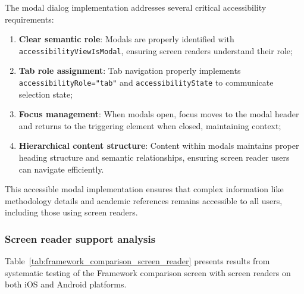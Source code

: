 \FloatBarrier

The modal dialog implementation addresses several critical accessibility requirements:

\begin{enumerate}
    \item \textbf{Clear semantic role}: Modals are properly identified with \texttt{accessibilityViewIsModal}, ensuring screen readers understand their role;
    
    \item \textbf{Tab role assignment}: Tab navigation properly implements \texttt{accessibilityRole="tab"} and \texttt{accessibilityState} to communicate selection state;
    
    \item \textbf{Focus management}: When modals open, focus moves to the modal header and returns to the triggering element when closed, maintaining context;
    
    \item \textbf{Hierarchical content structure}: Content within modals maintains proper heading structure and semantic relationships, ensuring screen reader users can navigate efficiently.
\end{enumerate}

This accessible modal implementation ensures that complex information like methodology details and academic references remains accessible to all users, including those using screen readers.

\subsubsection{Screen reader support analysis}

Table~\ref{tab:framework_comparison_screen_reader} presents results from systematic testing of the Framework comparison screen with screen readers on both iOS and Android platforms.

